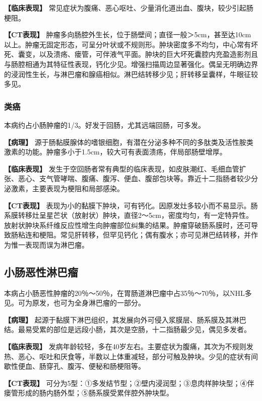 \textbf{【临床表现】}
常见症状为腹痛、恶心呕吐、少量消化道出血、腹块，较少引起肠梗阻。

\textbf{【CT表现】}
肿瘤多向肠腔外生长，位于肠壁间；直径一般＞5cm，甚至达10cm以上。肿瘤无固定形态，可呈分叶状或不规则形。肿块密度多不均匀，中心常有坏死、囊变，以及溃疡、瘘管，可伴液气平面。肿块的巨大坏死囊腔内充盈造影剂且与肠腔相通为其特征性表现，钙化少见。增强扫描周边显著强化。偶呈无明确边界的浸润性生长，与淋巴瘤和腺癌相似。淋巴结转移少见；肝转移呈囊样，牛眼征较多见。

\subsubsection{类癌}

本病约占小肠肿瘤的1/3。好发于回肠，尤其远端回肠，可多发。

\textbf{【病理】}
源于肠黏膜腺体的嗜银细胞，有潜在分泌多种不同的多肽类及活性胺类激素的功能。肿瘤多小于1.5cm，较大可有表面溃疡，伴局部肠壁增厚。

\textbf{【临床表现】}
发生于空回肠者常有典型的临床表现，如皮肤潮红、毛细血管扩张、恶心、支气管哮喘、腹痛、腹泻、便血、腹部包块等。靠近十二指肠者较少分泌激素，主要表现为梗阻和局部感染。

\textbf{【CT表现】}
表现为小的黏膜下肿块，可有钙化。因原发灶多较小而不易显示。肠系膜转移灶呈星芒状（放射状）肿块，直径2～5cm，密度均匀，有一定特异性。放射状肿块系纤维反应性增生向肿瘤部位纠集的结果。肿瘤穿破肠系膜时，还可导致肠粘连和梗阻。常见肝转移，但罕见钙化；偶有腹水；亦可见淋巴结转移，并作为惟一表现而误为淋巴瘤。

\subsection{小肠恶性淋巴瘤}

本病占小肠恶性肿瘤的20％～50％，在胃肠道淋巴瘤中占35％～70％，以NHL多见。可为原发，也可为全身淋巴瘤的一部分。

\textbf{【病理】}
起源于黏膜下淋巴组织，其发展向外可侵入浆膜层、肠系膜及其淋巴结。最易受累的部位是远段小肠，其次是空肠，十二指肠最少见，偶见多发者。

\textbf{【临床表现】}
发病年龄较轻，多在40岁左右。主要症状为腹痛，其次为不规则发热、恶心、呕吐和厌食等，半数以上体重减轻，部分可触及肿块。少见的症状有间歇性便血、肠穿孔、腹泻、便秘和肠梗阻等。

\textbf{【CT表现】}
可分为5型：①多发结节型；②壁内浸润型；③息肉样肿块型；④伴瘘管形成的肠内肠外型；⑤肠系膜受累伴腔外肿块型。

